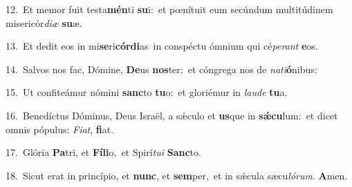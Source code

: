 {\numbfont\textcolor{\numbcolor}{12.}}~Et memor fuit testa\-\textbf{mén}\-ti \textbf{su}\-i:~\star et pœnítuit eum secúndum multitúdinem misericór\-\textit{di}\-\textit{æ} \textbf{su}\-æ.\par
{\numbfont\textcolor{\numbcolor}{13.}}~Et dedit eos in mi\-\textbf{se}\-ri\-\textbf{cór}\-\textbf{di}as~\star in conspéctu ómnium qui cé\-\textit{pe}\-\textit{rant} \textbf{e}\-os.\par
{\numbfont\textcolor{\numbcolor}{14.}}~Salvos nos fac, Dómine, \textbf{De}\-us \textbf{nos}\-ter:~\star et cóngrega nos de \textit{na}\-\textit{ti}\textbf{ó}nibus:\par
{\numbfont\textcolor{\numbcolor}{15.}}~Ut confiteámur nómini \textbf{sanc}\-to \textbf{tu}\-o:~\star et gloriémur in \textit{lau}\-\textit{de} \textbf{tu}\-a.\par
{\numbfont\textcolor{\numbcolor}{16.}}~Benedíctus Dóminus, Deus Israël, a sǽculo et \textbf{us}\-que in \textbf{sǽ}\-\textbf{cu}lum:~\star et dicet omnis pópulus: \textit{Fi}\-\textit{at}, \textbf{fi}\-at.\par
{\numbfont\textcolor{\numbcolor}{17.}}~Glória \textbf{Pa}\-tri, et \textbf{Fí}\-\textbf{li}o,~\star et Spirí\-\textit{tu}\-\textit{i} \textbf{Sanc}\-to.\par
{\numbfont\textcolor{\numbcolor}{18.}}~Sicut erat in princípio, et \textbf{nunc}\-, et \textbf{sem}\-per,~\star et in sǽcula sæcu\-\textit{ló}\-\textit{rum}. \textbf{A}\-men.\par
